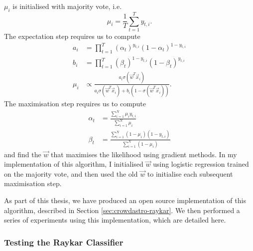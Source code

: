         $\mu_i$ is initialised with majority vote, i.e.
        \begin{equation*}
            \mu_i = \frac{1}{T} \sum_{t = 1}^T y_{t, i}.
        \end{equation*}
        The expectation step requires us to compute
        \begin{align*}
            a_i &= \prod_{t = 1}^T
                (\alpha_t)^{y_{t, i}} (1 - \alpha_t)^{1 - y_{t, i}}\\
            b_i &= \prod_{t = 1}^T
                (\beta_t)^{1 - y_{t, i}} (1 - \beta_t)^{y_{t, i}}\\
            \mu_i &\propto
                \frac{a_i \sigma(\vec w^T \vec x_i)}
                     {a_i \sigma(\vec w^T \vec x_i) +
                      b_i (1 - \sigma(\vec w^T \vec x_i))}.
        \end{align*}
        The maximisation step requires us to compute
        \begin{align}
            \label{eq:raykar-alpha}
            \alpha_t &= \frac{\sum_{i = 1}^N \mu_i y_{t, i}}
                             {\sum_{i = 1}^N \mu_i}\\
            \label{eq:raykar-beta}
            \beta_t &= \frac{\sum_{i = 1}^N (1 - \mu_i) (1 - y_{t, i})}
                            {\sum_{i = 1}^N (1 - \mu_i)}
        \end{align}
        and find the $\vec w$ that maximises the likelihood using gradient
        methods. In my implementation of this algorithm, I initialised $\vec w$
        using logistic regression trained on the majority vote, and then used
        the old $\vec w$ to initialise each subsequent maximisation step.

        As part of this thesis, we have produced an open source implementation
        of this algorithm, described in Section \ref{sec:crowdastro-raykar}. We
        then performed a series of experiments using this implementation, which
        are detailed here.

        \subsubsection{Testing the Raykar Classifier}

